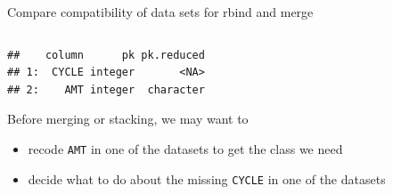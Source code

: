 \documentclass[
  8pt,
  ignorenonframetext,
  aspectratio=169]{beamer}
\providecommand{\tightlist}{%
  \setlength{\itemsep}{0pt}\setlength{\parskip}{0pt}}
\begin{document}
\begin{frame}[fragile]{Compare compatibility of data sets for rbind and
merge}
\begin{columns}[T]
\begin{column}{0.48\textwidth}
\begin{verbatim}
##    column      pk pk.reduced
## 1:  CYCLE integer       <NA>
## 2:    AMT integer  character
\end{verbatim}

\vspace{12pt}

Before merging or stacking, we may want to

\begin{itemize}
\tightlist
\item
  recode \texttt{AMT} in one of the datasets to get the class we need
\item
  decide what to do about the missing \texttt{CYCLE} in one of the
  datasets
\end{itemize}
\end{column}
\end{columns}
\end{frame}
\end{document}

